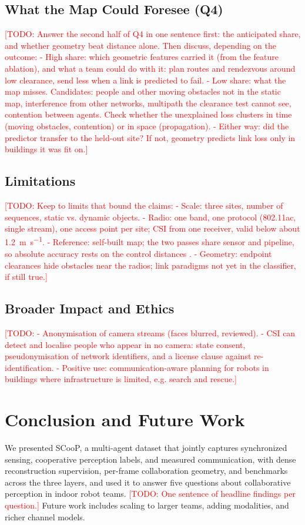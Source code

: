 \documentclass[journal]{IEEEtran}
\newcommand{\todo}[1]{\textcolor{red}{[TODO: #1]}}
\begin{document}
\subsection{What the Map Could Foresee (Q4)}
\todo{Answer the second half of Q4 in one sentence first: the anticipated share, and
whether geometry beat distance alone.
Then discuss, depending on the outcome:
- High share: which geometric features carried it (from the feature
  ablation), and what a team could do with it: plan routes and
  rendezvous around low clearance, send less when a link is predicted
  to fail.
- Low share: what the map misses. Candidates: people and other
  moving obstacles not in the static map, interference from other
  networks, multipath the clearance test cannot see, contention
  between agents. Check whether the unexplained loss clusters in
  time (moving obstacles, contention) or in space (propagation).
- Either way: did the predictor transfer to the held-out site? If
  not, geometry predicts link loss only in buildings it was fit on.}

\subsection{Limitations}
\todo{Keep to limits that bound the claims:
- Scale: three sites, number of sequences, static vs. dynamic objects.
- Radio: one band, one protocol (802.11ac, single stream), one access
  point per site; CSI from one receiver, valid below about
  \SI{1.2}{\metre\per\second}.
- Reference: self-built map; the two passes share sensor and pipeline,
  so absolute accuracy rests on the control distances
  \cite{scoop_testbed}.
- Geometry: endpoint clearances hide obstacles near the radios; link
  paradigms not yet in the classifier, if still true.}

\subsection{Broader Impact and Ethics}
\todo{- Anonymisation of camera streams (faces blurred, reviewed).
- CSI can detect and localise people who appear in no camera: state
  consent, pseudonymisation of network identifiers, and a license
  clause against re-identification.
- Positive use: communication-aware planning for robots in buildings
  where infrastructure is limited, e.g. search and rescue.}

\section{Conclusion and Future Work}
\label{sec:conclusion}
We presented SCooP, a multi-agent dataset that jointly captures
synchronized sensing, cooperative perception labels, and measured
communication, with dense reconstruction supervision, per-frame
collaboration geometry, and benchmarks across the three layers, and
used it to answer five questions about collaborative perception in
indoor robot teams. \todo{One sentence of headline findings per
question.} Future work includes scaling
to larger teams, adding modalities, and richer channel models.
\end{document}
